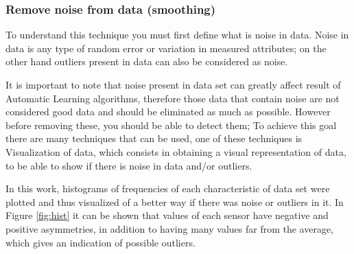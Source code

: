 \subsubsection{Remove noise from data (smoothing)}

To understand this technique you must first define what is noise in data. Noise in data is any type of random error or variation in measured attributes; on the other hand outliers present in data can also be considered as noise.

\vspace{5mm} %

It is important to note that noise present in data set can greatly affect  result of Automatic Learning algorithms, therefore those data that contain noise are not considered good data and should be eliminated as much as possible. However before removing these, you should be able to detect them; To achieve this goal there are many techniques that can be used, one of these techniques is Visualization of data, which consists in obtaining a visual representation of data, to be able to show if there is noise in data and/or outliers.

\vspace{5mm} %

In this work, histograms of frequencies of each characteristic of data set were plotted and thus visualized of a better way if there was noise or outliers in it. In Figure \ref{fig:hist} it can be shown that values of each sensor have negative and positive asymmetries, in addition to having many values far from the average, which gives an indication of possible outliers.

